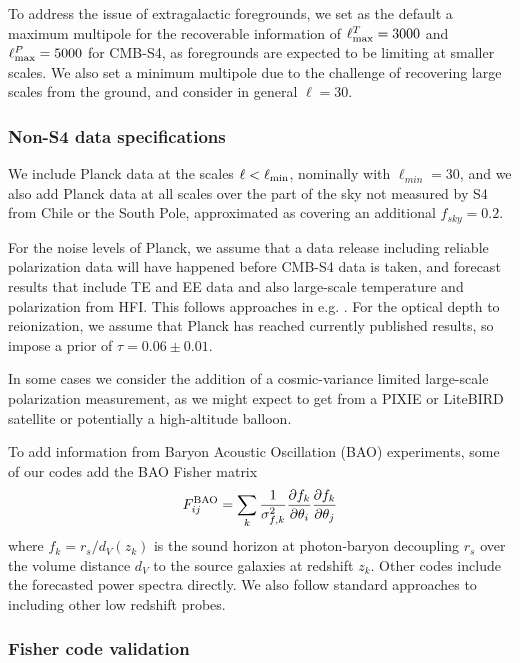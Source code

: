 To address the issue of extragalactic foregrounds, we set as the default a maximum multipole for the recoverable information of $\ell^T_{\rm max} = 3000$ and $\ell^P_{\rm max} = 5000$ for CMB-S4, as foregrounds are expected to be limiting at smaller scales. We also set a minimum multipole due to the challenge of recovering large scales from the ground, and consider in general $\ell=30$. 

\subsubsection{Non-S4 data specifications}

We include Planck data at the scales $\ell<\ell_{\rm min}$, nominally with $\ell_{min}=30$, and we also add Planck data at all scales over the part of the sky not measured by S4 from Chile or the South Pole, approximated as covering an additional $f_{sky}=0.2$.

For the noise levels of Planck, we assume that a data release including reliable polarization data will have happened before CMB-S4 data is taken, and forecast results that include TE and EE data and also large-scale temperature and polarization from HFI. This follows approaches in e.g. \cite{Allison:2015qca}. For the optical depth to reionization, we assume that Planck has reached currently published results, so impose a prior of $\tau=0.06\pm0.01$.

In some cases we consider the addition of a cosmic-variance limited large-scale polarization measurement, as we might expect to get from a PIXIE or LiteBIRD satellite or potentially a high-altitude balloon.

To add information from Baryon Acoustic Oscillation (BAO) experiments, some of our codes add the BAO Fisher matrix
%
\begin{equation}
F_{ij}^{\rm BAO} = \sum_{k} \frac{1}{\sigma_{f,k}^2}\frac{\partial f_k}{\partial \theta_i}\frac{\partial f_k}{\partial \theta_j}
\end{equation}
%
where $f_k = r_s/d_V(z_k)$ is the sound horizon at photon-baryon decoupling $r_s$ over the volume distance $d_V$ to the source galaxies at redshift $z_k$. Other codes include the forecasted power spectra directly. We also follow standard approaches to including other low redshift probes.

\subsubsection{Fisher code validation}

